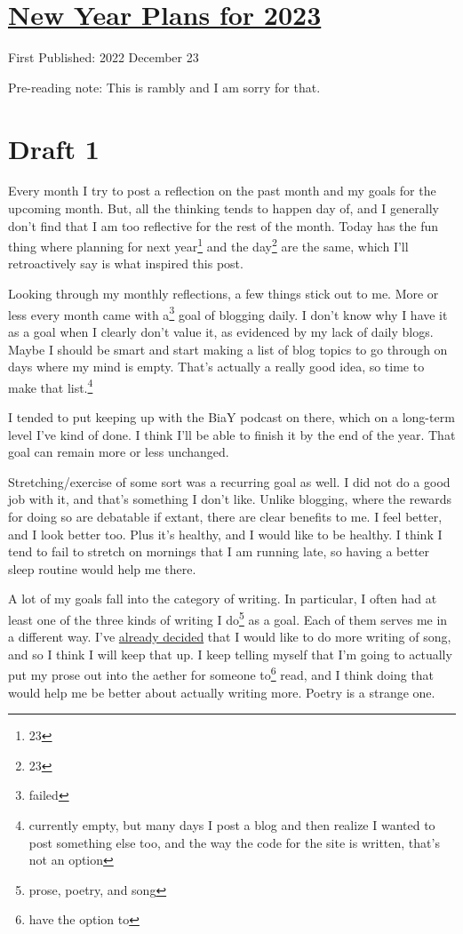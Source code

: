 \documentclass[12pt]{article}[titlepage]
\newcommand{\1}{\={a}}
\newcommand{\2}{\={e}}
\newcommand{\3}{\={\i}}
\newcommand{\4}{\=o}
\newcommand{\5}{\=u}
\newcommand{\6}{\={A}}
\renewcommand{\,}{\textsuperscript{,}}
\begin{document}
\doublespacing
\section{\href{new-year-plans-23.html}{New Year Plans for 2023}}
First Published: 2022 December 23

Pre-reading note: This is rambly and I am sorry for that.
\section{Draft 1}
Every month I try to post a reflection on the past month and my goals for the upcoming month.
But, all the thinking tends to happen day of, and I generally don't find that I am too reflective for the rest of the month.
Today has the fun thing where planning for next year\footnote{23} and the day\footnote{23} are the same, which I'll retroactively say is what inspired this post.

Looking through my monthly reflections, a few things stick out to me.
More or less every month came with a\footnote{failed} goal of blogging daily.
I don't know why I have it as a goal when I clearly don't value it, as evidenced by my lack of daily blogs.
Maybe I should be smart and start making a list of blog topics to go through on days where my mind is empty.
That's actually a really good idea, so time to make that list.\footnote{currently empty, but many days I post a blog and then realize I wanted to post something else too, and the way the code for the site is written, that's not an option}

I tended to put keeping up with the BiaY podcast on there, which on a long-term level I've kind of done.
I think I'll be able to finish it by the end of the year.
That goal can remain more or less unchanged.

Stretching/exercise of some sort was a recurring goal as well.
I did not do a good job with it, and that's something I don't like.
Unlike blogging, where the rewards for doing so are debatable if extant, there are clear benefits to me.
I feel better, and I look better too.
Plus it's healthy, and I would like to be healthy.
I think I tend to fail to stretch on mornings that I am running late, so having a better sleep routine would help me there.

A lot of my goals fall into the category of writing.
In particular, I often had at least one of the three kinds of writing I do\footnote{prose, poetry, and song} as a goal.
Each of them serves me in a different way.
I've \href{species-counterpoint-planning.html}{already decided} that I would like to do more writing of song, and so I think I will keep that up.
I keep telling myself that I'm going to actually put my prose out into the aether for someone to\footnote{have the option to} read, and I think doing that would help me be better about actually writing more.
Poetry is a strange one.
\end{document}
